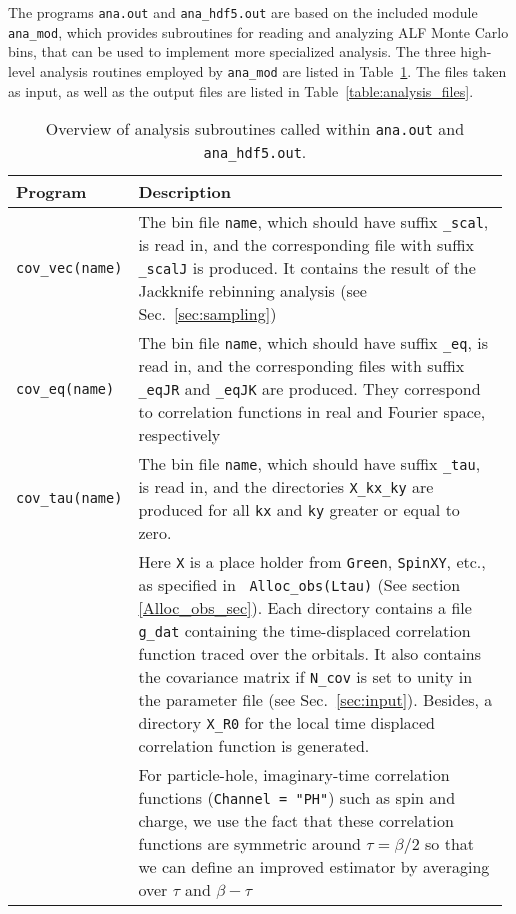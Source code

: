 The programs \texttt{ana.out} and \texttt{ana\_hdf5.out} are based on the included module \texttt{ana\_mod}, which provides subroutines for reading and analyzing ALF Monte Carlo bins, that can be used to implement more specialized analysis. The three high-level analysis routines employed by \texttt{ana\_mod} are listed in Table~\ref{table:analysis_programs}. The files taken as input, as well as the output files are listed in Table~\ref{table:analysis_files}.

\begin{table}[h]
	\begin{center}
	\begin{tabular}{@{} p{0.18\linewidth} @{$\;$} p{0.8\linewidth} @{}}\toprule
		Program & Description \\\midrule
		\texttt{cov\_vec(name)}  &  
		  The bin file \texttt{name}, which should have suffix \texttt{\_scal}, is read in, and  the corresponding file with suffix \texttt{\_scalJ} is produced. It contains the result of the Jackknife rebinning analysis (see Sec.~\ref{sec:sampling}) \\
		\texttt{cov\_eq(name)}    &  
		  The bin file \texttt{name}, which should have suffix \texttt{\_eq}, is read in, and the corresponding files with suffix \texttt{\_eqJR} and \texttt{\_eqJK} are produced. They  correspond to correlation functions in real and Fourier space, respectively \\
		\texttt{cov\_tau(name)}   &  
		  The bin file \texttt{name}, which should have suffix \texttt{\_tau}, is read in, and the directories \texttt{X\_kx\_ky} are produced for all \texttt{kx} and \texttt{ky} greater or equal to zero. \\
		& Here \texttt{X}  is a place holder from \texttt{Green}, \texttt{SpinXY}, etc., as specified in \texttt{ Alloc\_obs(Ltau)} (See section \ref{Alloc_obs_sec}). Each directory contains  a  file    \texttt{g\_dat}  containing the  time-displaced correlation function traced over the  orbitals.  It also contains the covariance matrix if \texttt{N\_cov} is set to unity in the parameter file (see Sec.~\ref{sec:input}). Besides, a directory \texttt{X\_R0} for the local time displaced correlation function is generated. \\
		& For particle-hole, imaginary-time correlation functions (\texttt{Channel = "PH"}) such as spin and charge, we use the fact that these correlation functions  are symmetric around $\tau = \beta/2$ so that we can define an improved estimator by averaging over $\tau$ and $\beta - \tau$
		\\\bottomrule
	\end{tabular}
	\caption{Overview of analysis subroutines called within \texttt{ana.out} and \texttt{ana\_hdf5.out}. \label{table:analysis_programs}}
\end{center}
\end{table}
